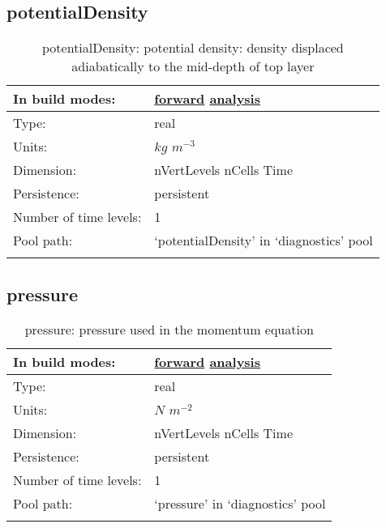 \subsection[potentialDensity]{potentialDensity}
\label{subsec:var_sec_diagnostics_potentialDensity}
\begin{center}
\begin{longtable}{| p{2.0in} | p{4.0in} |}
        \hline 
        In build modes: & \hyperref[subsec:forward_var_tab_diagnostics]{forward} \hyperref[subsec:analysis_var_tab_diagnostics]{analysis} \\
        \hline 
        Type: & real \\
        \hline 
        Units: & $kg$ $m^{-3}$ \\
        \hline 
        Dimension: & nVertLevels nCells Time \\
        \hline 
        Persistence: & persistent \\
        \hline 
        Number of time levels: & 1 \\
        \hline 
            Pool path: & `potentialDensity' in `diagnostics' pool \\
		 \hline 
    \caption{potentialDensity: potential density: density displaced adiabatically to the mid-depth of top layer}
\end{longtable}
\end{center}
\subsection[pressure]{pressure}
\label{subsec:var_sec_diagnostics_pressure}
\begin{center}
\begin{longtable}{| p{2.0in} | p{4.0in} |}
        \hline 
        In build modes: & \hyperref[subsec:forward_var_tab_diagnostics]{forward} \hyperref[subsec:analysis_var_tab_diagnostics]{analysis} \\
        \hline 
        Type: & real \\
        \hline 
        Units: & $N$ $m^{-2}$ \\
        \hline 
        Dimension: & nVertLevels nCells Time \\
        \hline 
        Persistence: & persistent \\
        \hline 
        Number of time levels: & 1 \\
        \hline 
            Pool path: & `pressure' in `diagnostics' pool \\
		 \hline 
    \caption{pressure: pressure used in the momentum equation}
\end{longtable}
\end{center}
